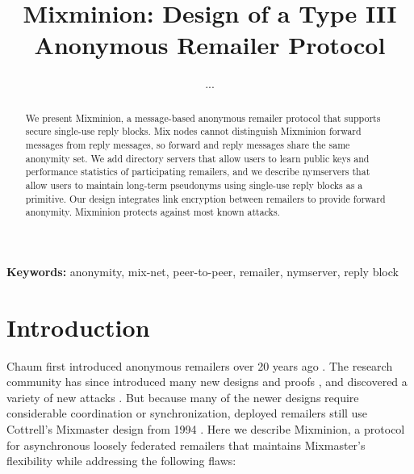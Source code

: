 \documentclass[11pt]{IEEEtran}
\newcommand\emailaddr{\begingroup \def\UrlLeft{<}\def\UrlRight{>}\urlstyle{tt}\Url}
\begin{document}

\title{Mixminion: Design of a Type III Anonymous Remailer Protocol}

% 
\author{...}

\maketitle
\pagestyle{plain} 
 
\begin{abstract}

We present Mixminion, a message-based anonymous remailer protocol that
supports secure single-use reply blocks. Mix nodes cannot distinguish
Mixminion forward messages from reply messages, so forward and reply
messages share
the same anonymity set. We add directory servers that allow users to
learn public keys and performance statistics of participating remailers,
and we describe nymservers that allow users to maintain long-term
pseudonyms using single-use reply blocks as a primitive. Our design
integrates link encryption between remailers to provide
forward anonymity. Mixminion %
protects against most known attacks.

\end{abstract}

\noindent \textbf{Keywords:} anonymity, mix-net, peer-to-peer, remailer, nymserver, reply block


\section{Introduction}
\label{sec:intro}

Chaum first introduced anonymous remailers over 20 years ago
\cite{chaum-mix}. The research community has since introduced many new
designs and proofs \cite{abe}\cite{babel}\cite{flash-mix}\cite{kesdogan}\cite{shuffle}\cite{hybrid-mix},
and discovered a variety of new attacks
\cite{back-traffic-analysis}\cite{langos02}\cite{disad-free-routes}\cite{desmedt}\cite{mitkuro}\cite{raymond00}.
But because many of the newer designs require considerable coordination or
synchronization, deployed remailers still use Cottrell's Mixmaster
design from 1994 \cite{mixmaster-attacks}\cite{mixmaster-spec}. Here we describe
Mixminion, a protocol for asynchronous loosely federated remailers that
maintains Mixmaster's flexibility while addressing the following flaws:
\end{document}

